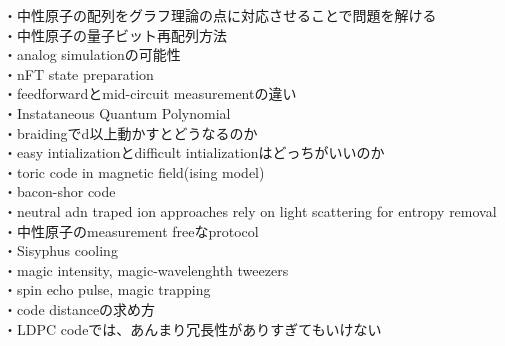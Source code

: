 \documentclass[a4paper,10.5pt]{ltjsarticle}
\begin{document}
・中性原子の配列をグラフ理論の点に対応させることで問題を解ける\\
・中性原子の量子ビット再配列方法\\
・analog simulationの可能性\\
・nFT state preparation\\
・feedforwardとmid-circuit measurementの違い\\
・Instataneous Quantum Polynomial\\
・braidingでd以上動かすとどうなるのか\\
・easy intializationとdifficult intializationはどっちがいいのか\\
・toric code in magnetic field(ising model)\\
・bacon-shor code\\
・neutral adn traped ion approaches rely on light scattering for entropy removal\\
・中性原子のmeasurement freeなprotocol\\
・Sisyphus cooling\\
・magic intensity, magic-wavelenghth tweezers\\
・spin echo pulse, magic trapping\\
・code distanceの求め方\\
・LDPC codeでは、あんまり冗長性がありすぎてもいけない\\
\end{document}

